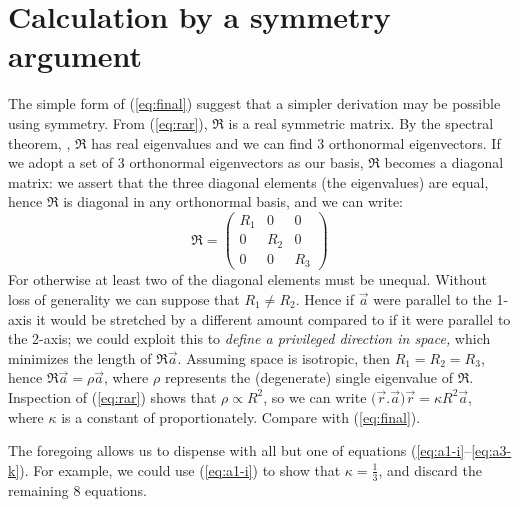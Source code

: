 \documentclass[]{article}
\begin{document}
\section{Calculation by a symmetry argument}\label{sect:symmetry}
The simple form of (\ref{eq:final}) suggest that a simpler derivation may be possible using symmetry. From (\ref{eq:rar}), $\mathfrak{R}$ is a real symmetric matrix. By the spectral theorem, \cite{spectral-theorem} \cite{bellman1970}, $\mathfrak{R}$ has real eigenvalues and we can find 3 orthonormal eigenvectors. If we adopt a set of 3 orthonormal eigenvectors as our basis, $\mathfrak{R}$ becomes a diagonal matrix: we assert that the three diagonal elements (the eigenvalues) are equal, hence $\mathfrak{R}$ is diagonal in any orthonormal basis, and we can write:
\[\mathfrak{R}= 
\begin{pmatrix}
R_1 & 0 & 0 \\
0 & R_2 & 0 \\
0 & 0 & R_3
\end{pmatrix}
\]
For otherwise at least two of the diagonal elements must be unequal. Without loss of generality we can suppose that $R_1 \neq R_2$. Hence if $\vec{a}$ were parallel to the 1-axis it would be stretched by a different amount compared to if it were parallel to the 2-axis; we could exploit this to \emph{define a privileged direction in space,} which minimizes the length of $\mathfrak{R}\vec{a}$. Assuming space is isotropic, then $R_1=R_2=R_3$, hence $\mathfrak{R}\vec{a}=\rho\vec{a}$, where $\rho$ represents the (degenerate) single eigenvalue of $\mathfrak{R}$. Inspection of (\ref{eq:rar}) shows that $\rho \propto R^2$, so we can write $\big(\vec{r}.\vec{a}\big)\vec{r}=\kappa R^2 \vec{a}$, where $\kappa$ is a constant of proportionately. Compare with (\ref{eq:final}).

The foregoing allows us to dispense with all but one of equations (\ref{eq:a1-i}--\ref{eq:a3-k}). For example, we could use (\ref{eq:a1-i}) to show that $\kappa=\frac{1}{3}$, and discard the remaining 8 equations.
\end{document}
